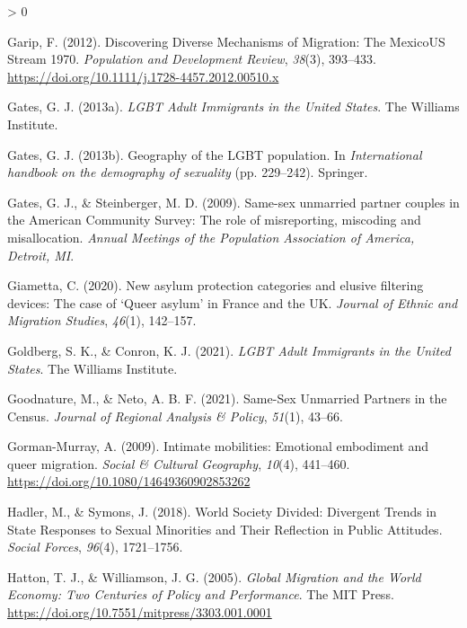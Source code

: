 \documentclass[
  11pt,
]{article}
\newlength{\cslhangindent}
\newenvironment{CSLReferences}[2] %
 {%
  \setlength{\parindent}{0pt}
  \ifodd #1 \everypar{\setlength{\hangindent}{\cslhangindent}}\ignorespaces\fi
  \ifnum #2 > 0
  \setlength{\parskip}{#2\baselineskip}
  \fi
 }%
 {}
\begin{document}
\begin{CSLReferences}{1}{0}
\leavevmode\hypertarget{ref-garip_2012}{}%
Garip, F. (2012). Discovering {Diverse Mechanisms} of {Migration}: {The Mexico}{{US Stream}} 1970{}. \emph{Population and Development Review}, \emph{38}(3), 393--433. \url{https://doi.org/10.1111/j.1728-4457.2012.00510.x}

\leavevmode\hypertarget{ref-gates_2013}{}%
Gates, G. J. (2013a). \emph{{LGBT Adult Immigrants} in the {United States}}. {The Williams Institute}.

\leavevmode\hypertarget{ref-gates_2013a}{}%
Gates, G. J. (2013b). Geography of the {LGBT} population. In \emph{International handbook on the demography of sexuality} (pp. 229--242). {Springer}.

\leavevmode\hypertarget{ref-gates_2009}{}%
Gates, G. J., \& Steinberger, M. D. (2009). Same-sex unmarried partner couples in the {American Community Survey}: {The} role of misreporting, miscoding and misallocation. \emph{Annual Meetings of the Population Association of America, Detroit, {MI}}.

\leavevmode\hypertarget{ref-giametta_2020}{}%
Giametta, C. (2020). New asylum protection categories and elusive filtering devices: The case of {`{Queer} asylum'} in {France} and the {UK}. \emph{Journal of Ethnic and Migration Studies}, \emph{46}(1), 142--157.

\leavevmode\hypertarget{ref-goldberg_2021}{}%
Goldberg, S. K., \& Conron, K. J. (2021). \emph{{LGBT Adult Immigrants} in the {United States}}. {The Williams Institute}.

\leavevmode\hypertarget{ref-goodnature_2021}{}%
Goodnature, M., \& Neto, A. B. F. (2021). Same-{Sex Unmarried Partners} in the {Census}. \emph{Journal of Regional Analysis \& Policy}, \emph{51}(1), 43--66.

\leavevmode\hypertarget{ref-gorman-murray_2009}{}%
Gorman-Murray, A. (2009). Intimate mobilities: Emotional embodiment and queer migration. \emph{Social \& Cultural Geography}, \emph{10}(4), 441--460. \url{https://doi.org/10.1080/14649360902853262}

\leavevmode\hypertarget{ref-hadler_2018_world}{}%
Hadler, M., \& Symons, J. (2018). World {Society Divided}: {Divergent Trends} in {State Responses} to {Sexual Minorities} and {Their Reflection} in {Public Attitudes}. \emph{Social Forces}, \emph{96}(4), 1721--1756.

\leavevmode\hypertarget{ref-hatton_2005a}{}%
Hatton, T. J., \& Williamson, J. G. (2005). \emph{Global {Migration} and the {World Economy}: {Two Centuries} of {Policy} and {Performance}}. {The MIT Press}. \url{https://doi.org/10.7551/mitpress/3303.001.0001}


\end{CSLReferences}
\end{document}
